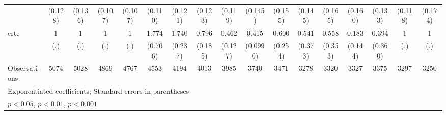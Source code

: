 {\begin{tabular}{l*{16}{c}}
                    &     (0.128)         &     (0.136)         &     (0.107)         &     (0.107)         &     (0.110)         &     (0.121)         &     (0.123)         &     (0.119)         &     (0.145)         &     (0.155)         &     (0.145)         &     (0.165)         &     (0.160)         &     (0.133)         &     (0.118)         &     (0.174)         \\
[1em]
erte                &           1         &           1         &           1         &           1         &       1.774         &       1.740\sym{***}&       0.796         &       0.462\sym{**} &       0.415\sym{***}&       0.600         &       0.541         &       0.558         &       0.183\sym{*}  &       0.394         &           1         &           1         \\
                    &         (.)         &         (.)         &         (.)         &         (.)         &     (0.706)         &     (0.237)         &     (0.185)         &     (0.127)         &    (0.0990)         &     (0.254)         &     (0.373)         &     (0.353)         &     (0.144)         &     (0.360)         &         (.)         &         (.)         \\
\hline
Observations        &        5074         &        5028         &        4869         &        4767         &        4553         &        4194         &        4013         &        3985         &        3740         &        3471         &        3278         &        3320         &        3327         &        3375         &        3297         &        3250         \\
\hline\hline
\multicolumn{17}{l}{\footnotesize Exponentiated coefficients; Standard errors in parentheses}\\
\multicolumn{17}{l}{\footnotesize \sym{*} \(p<0.05\), \sym{**} \(p<0.01\), \sym{***} \(p<0.001\)}\\
\end{tabular}
}
